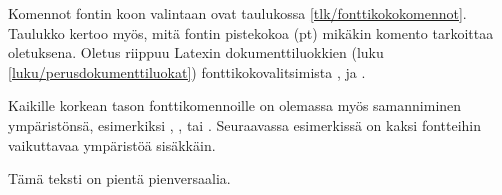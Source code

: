 Komennot fontin koon valintaan ovat taulukossa
\ref{tlk/fonttikokokomennot}. Taulukko kertoo myös, mitä fontin
pistekokoa (pt) mikäkin komento tarkoittaa oletuksena. Oletus riippuu
Latexin dokumenttiluokkien (luku \ref{luku/perusdokumenttiluokat})
fonttikokovalitsimista \koodi{10pt}, \koodi{11pt} ja \koodi{12pt}.


%

Kaikille korkean tason fonttikomennoille on olemassa myös samanniminen
ympäristönsä, esimerkiksi , ,
 tai . Seuraavassa esimerkissä on
kaksi fontteihin vaikuttavaa ympäristöä sisäkkäin.

\begin{koodilohkosis}
\begin{footnotesize}
  \begin{scshape}
    Tämä teksti on pientä pienversaalia.
  \end{scshape}
\end{footnotesize}
\end{koodilohkosis}

